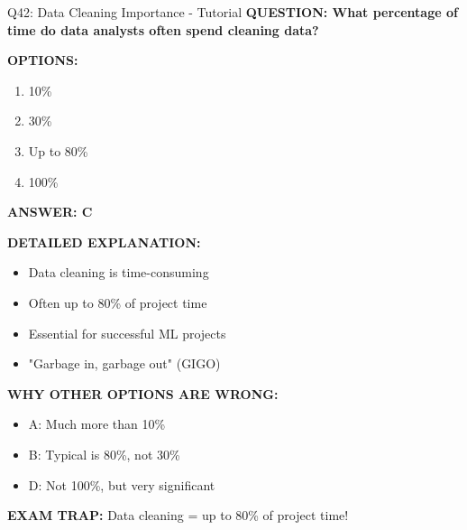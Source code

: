 \documentclass[8pt]{beamer}
\begin{document}
	\begin{frame}{Q42: Data Cleaning Importance - Tutorial}
		\fontsize{6.5}{7.5}\selectfont
		\textbf{QUESTION: What percentage of time do data analysts often spend cleaning data?}
		
		\vspace{0.1cm}
		\textbf{OPTIONS:}
		\begin{enumerate}
			\item 10\%
			\item 30\%
			\item Up to 80\%
			\item 100\%
		\end{enumerate}
		
		\vspace{0.1cm}
		\textcolor{myblue}{\textbf{ANSWER: C}}
		
		\vspace{0.1cm}
		\textbf{DETAILED EXPLANATION:}
		\begin{itemize}
			\item Data cleaning is time-consuming
			\item Often up to 80\% of project time
			\item Essential for successful ML projects
			\item "Garbage in, garbage out" (GIGO)
		\end{itemize}
		
		\vspace{0.1cm}
		\textcolor{myred}{\textbf{WHY OTHER OPTIONS ARE WRONG:}}
		\begin{itemize}
			\item \textcolor{myred}{A:} Much more than 10\%
			\item \textcolor{myred}{B:} Typical is 80\%, not 30\%
			\item \textcolor{myred}{D:} Not 100\%, but very significant
		\end{itemize}
		
		\textcolor{myred}{\textbf{EXAM TRAP:}} Data cleaning = \textcolor{myblue}{up to 80\% of project time}!
	\end{frame}
	
\end{document}
